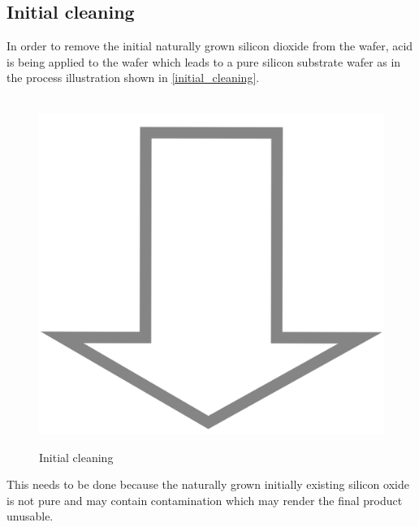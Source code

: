 \newpage

\subsection{Initial cleaning}
In order to remove the initial naturally grown silicon dioxide from the wafer, acid is being applied to the wafer which leads to a pure silicon substrate wafer as in the process illustration shown in \autoref{initial_cleaning}.

\begin{figure}[H]
	\centering
	\begin{tikzpicture}[node distance = 3cm, auto, thick,scale=\CrossSectionOnly, every node/.style={transform shape}]
		
	\end{tikzpicture} \\
	\includegraphics[scale=0.01]{down_arrow.png} \\
	\begin{tikzpicture}[node distance = 3cm, auto, thick,scale=\CrossSectionOnly, every node/.style={transform shape}]
		
	\end{tikzpicture}
	\caption{Initial cleaning}
	\label{initial_cleaning}
\end{figure}

This needs to be done because the naturally grown initially existing silicon oxide is not pure and may contain contamination which may render the final product unusable.

